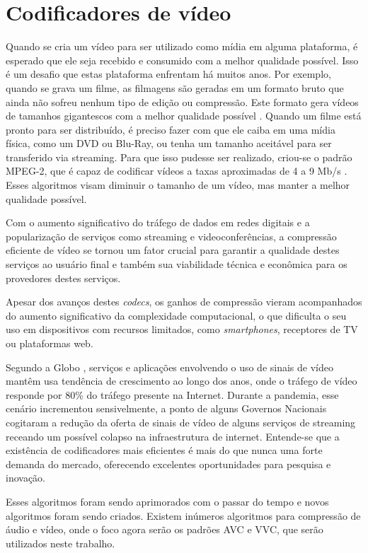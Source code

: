 \section{Codificadores de vídeo}%

Quando se cria um vídeo para ser utilizado como mídia em alguma plataforma, é esperado
que ele seja recebido e consumido com a melhor qualidade possível. Isso é um desafio
que estas plataforma enfrentam há muitos anos. Por exemplo, quando se grava um filme,
as filmagens são geradas em um formato bruto que ainda não sofreu nenhum tipo de edição
ou compressão. Este formato gera vídeos de tamanhos gigantescos com a melhor qualidade
possível \cite{what_is_raw_footage}. Quando um filme está pronto para ser distribuído,
é preciso fazer com que ele caiba em uma mídia física, como um DVD ou Blu-Ray, ou tenha
um tamanho aceitável para ser transferido via streaming. Para que isso pudesse ser
realizado, criou-se o padrão MPEG-2, que é capaz de codificar vídeos a taxas aproximadas
de 4 a 9 Mb/s \cite{mpeg2}. Esses algoritmos visam diminuir o tamanho de um vídeo,
mas manter a melhor qualidade possível.

Com o aumento significativo do tráfego de dados em redes digitais e a popularização
de serviços como streaming e videoconferências, a compressão eficiente de vídeo
se tornou um fator crucial para garantir a qualidade destes serviços ao usuário
final e também sua viabilidade técnica e econômica para os provedores destes
serviços.

Apesar dos avanços destes \textit{codecs}, os ganhos de compressão vieram acompanhados do
aumento significativo da complexidade computacional, o que dificulta o seu uso em
dispositivos com recursos limitados, como \textit{smartphones}, receptores de TV ou
plataformas web.

Segundo a Globo \cite{globo_panorama}, serviços e aplicações envolvendo o uso de sinais
de vídeo mantêm usa tendência de crescimento ao longo dos anos, onde o tráfego de
vídeo responde por 80\% do tráfego presente na Internet. Durante a pandemia, esse cenário
incrementou sensivelmente, a ponto de alguns Governos Nacionais cogitaram a redução da oferta 
de sinais de vídeo de alguns serviços de streaming receando um possível colapso na
infraestrutura de internet. Entende-se que a existência de codificadores
mais eficientes é mais do que nunca uma forte demanda do mercado, oferecendo excelentes
oportunidades para pesquisa e inovação.

Esses algoritmos foram sendo aprimorados com o passar do tempo e novos algoritmos
foram sendo criados. Existem inúmeros algoritmos para compressão de áudio e vídeo,
onde o foco agora serão os padrões \acrfull{AVC} e \acrfull{VVC}, que serão utilizados
neste trabalho.

